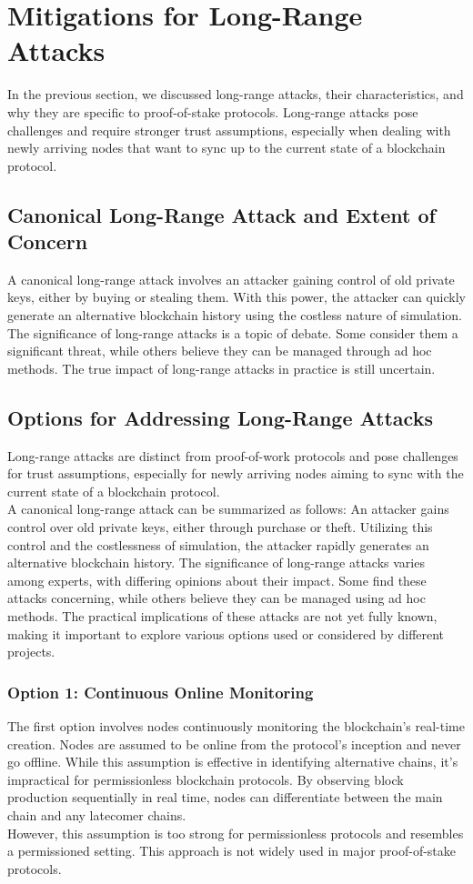 \section{Mitigations for Long-Range Attacks}
In the previous section, we discussed long-range attacks, their characteristics, and why they are specific to proof-of-stake protocols. Long-range attacks pose challenges and require stronger trust assumptions, especially when dealing with newly arriving nodes that want to sync up to the current state of a blockchain protocol.

\subsection*{Canonical Long-Range Attack and Extent of Concern}
A canonical long-range attack involves an attacker gaining control of old private keys, either by buying or stealing them. With this power, the attacker can quickly generate an alternative blockchain history using the costless nature of simulation.\\
The significance of long-range attacks is a topic of debate. Some consider them a significant threat, while others believe they can be managed through ad hoc methods. The true impact of long-range attacks in practice is still uncertain.
\subsection{Options for Addressing Long-Range Attacks}
Long-range attacks are distinct from proof-of-work protocols and pose challenges for trust assumptions, especially for newly arriving nodes aiming to sync with the current state of a blockchain protocol.\\
A canonical long-range attack can be summarized as follows: An attacker gains control over old private keys, either through purchase or theft. Utilizing this control and the costlessness of simulation, the attacker rapidly generates an alternative blockchain history. The significance of long-range attacks varies among experts, with differing opinions about their impact. Some find these attacks concerning, while others believe they can be managed using ad hoc methods. The practical implications of these attacks are not yet fully known, making it important to explore various options used or considered by different projects.

\subsubsection{Option 1: Continuous Online Monitoring}
The first option involves nodes continuously monitoring the blockchain's real-time creation. Nodes are assumed to be online from the protocol's inception and never go offline. While this assumption is effective in identifying alternative chains, it's impractical for permissionless blockchain protocols. By observing block production sequentially in real time, nodes can differentiate between the main chain and any latecomer chains.\\
However, this assumption is too strong for permissionless protocols and resembles a permissioned setting. This approach is not widely used in major proof-of-stake protocols.

